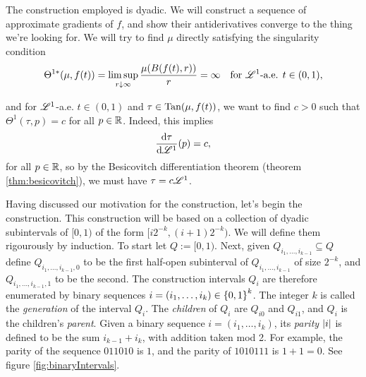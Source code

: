 The construction employed is dyadic. We will construct a sequence of approximate gradients of $f$, and show their antiderivatives converge to the thing we're looking for. We will try to find $\mu$ directly satisfying the singularity condition 
\begin{equation}
    \Theta^{1\ast}(\mu,f(t)) = \limsup_{r \downarrow \infty} \frac{\mu(B(f(t),r))}{r} = \infty \quad \text{for } \mathscr{L}^1\text{-a.e. } t \in (0,1),
\end{equation}

and for $\mathscr{L}^1$-a.e. $t \in (0,1)$ and $\tau \in \operatorname{Tan}(\mu,f(t))$, we want to find $c > 0$ such that $\Theta^{1}(\tau,p) = c$ for all $p \in \mathbb{R}$. Indeed, this implies 
\begin{equation}
    \frac{\operatorname{d}\!{\tau}}{\operatorname{d}\!{\mathscr{L}}^1}(p) = c,
\end{equation}
for all $p \in \mathbb{R}$, so by the Besicovitch differentiation theorem (theorem \ref{thm:besicovitch}), we must have $\tau = c\mathscr{L}^1$.

Having discussed our motivation for the construction, let's begin the construction. This construction will be based on a collection of dyadic subintervals of $[0,1)$ of the form $[i2^{-k},(i+1)2^{-k})$. We will define them rigourously by induction. To start let $Q := [0,1)$. Next, given $Q_{i_1,\dots,i_{k-1}} \subseteq Q$ define $Q_{i_1,\dots,i_{k-1},0}$ to be the first half-open subinterval of $Q_{i_1,\dots,i_{k-1}}$ of size $2^{-k}$, and $Q_{i_1,\dots,i_{k-1},1}$ to be the second. The construction intervals $Q_i$ are therefore enumerated by binary sequences $i = (i_1,\dots,i_k) \in \left\{ {0,1} \right\}^k$. The integer $k$ is called the \textit{generation} of the interval $Q_i$. The \textit{children} of $Q_i$ are $Q_{i0}$ and $Q_{i1}$, and $Q_i$ is the children's \textit{parent}. Given a binary sequence $i = (i_1,\dots,i_k)$, its \textit{parity} $\left\vert {i} \right\vert$ is defined to be the sum $i_{k-1} + i_k$, with addition taken mod 2. For example, the parity of the sequence $011010$ is $1$, and the parity of $1010111$ is $1 + 1 = 0$. See figure \ref{fig:binaryIntervals}.

